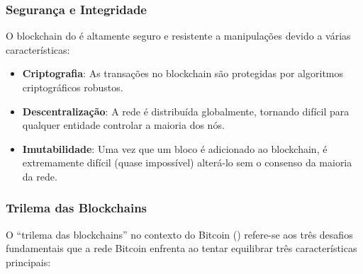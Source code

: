 \documentclass[a4paper,12pt]{article}
\begin{document}
\subsubsection{Segurança e Integridade}
\hspace{0.5cm}O blockchain do \btcspace é altamente seguro e resistente a manipulações devido a várias 
características:

\begin{itemize}
\item \textbf{Criptografia}: As transações no blockchain são protegidas por algoritmos criptográficos 
robustos.

\item \textbf{Descentralização}: A rede é distribuída globalmente, tornando difícil para qualquer entidade 
controlar a maioria dos nós.

\item \textbf{Imutabilidade}: Uma vez que um bloco é adicionado ao blockchain, é extremamente difícil 
(quase impossível) alterá-lo sem o consenso da maioria da rede.

\end{itemize}

\subsubsection{Trilema das Blockchains}
\hspace{0.5cm}O ``trilema das blockchains'' no contexto do Bitcoin (\btc) refere-se aos três desafios fundamentais 
que a rede Bitcoin enfrenta ao tentar equilibrar três características principais: 

\end{document}
